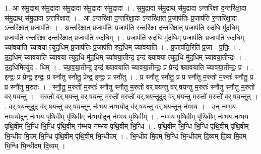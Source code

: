 \documentclass[17pt]{extarticle}
\begin{document}
1. आ स॑मु॒द्राथ् स॑मु॒द्रादा स॑मु॒द्रादा स॑मु॒द्रादा स॑मु॒द्रादा । . स॒मु॒द्रादा स॑मु॒द्राथ् स॑मु॒द्रादा ऽन्तरि॑क्षा द॒न्तरि॑क्षा॒दा स॑मु॒द्राथ् स॑मु॒द्रादा ऽन्तरि॑क्षात् । . आ ऽन्तरि॑क्षा द॒न्तरि॑क्षा॒दा ऽन्तरि॑क्षात् प्र॒जाप॑तिः प्र॒जाप॑ति र॒न्तरि॑क्षा॒दा ऽन्तरि॑क्षात् प्र॒जाप॑तिः । . अ॒न्तरि॑क्षात् प्र॒जाप॑तिः प्र॒जाप॑ति र॒न्तरि॑क्षा द॒न्तरि॑क्षात् प्र॒जाप॑ति रुद॒धि मु॑द॒धिम् प्र॒जाप॑ति र॒न्तरि॑क्षा द॒न्तरि॑क्षात् प्र॒जाप॑ति रुद॒धिम् । . प्र॒जाप॑ति रुद॒धि मु॑द॒धिम् प्र॒जाप॑तिः प्र॒जाप॑ति रुद॒धिम् च्या॑वयाति च्यावया त्युद॒धिम् प्र॒जाप॑तिः प्र॒जाप॑ति रुद॒धिम् च्या॑वयाति । . प्र॒जाप॑ति॒रिति॑ प्र॒जा - प॒तिः॒ । . उ॒द॒धिम् च्या॑वयाति च्यावया त्युद॒धि मु॑द॒धिम् च्या॑वया॒तीन्द्र॒ इन्द्र॑ श्च्यावया त्युद॒धि मु॑द॒धिम् च्या॑वया॒तीन्द्रः॑ । . उ॒द॒धिमित्यु॑द - धिम् । . च्या॒व॒या॒तीन्द्र॒ इन्द्र॑ श्च्यावयाति च्यावया॒तीन्द्रः॒ प्र प्रेन्द्र॑ श्च्यावयाति च्यावया॒तीन्द्रः॒ प्र । . इन्द्रः॒ प्र प्रेन्द्र॒ इन्द्रः॒ प्र स्नौ॑तु स्नौतु॒ प्रेन्द्र॒ इन्द्रः॒ प्र स्नौ॑तु । . प्र स्नौ॑तु स्नौतु॒ प्र प्र स्नौ॑तु म॒रुतो॑ म॒रुतः॑ स्नौतु॒ प्र प्र स्नौ॑तु म॒रुतः॑ । . स्नौ॒तु॒ म॒रुतो॑ म॒रुतः॑ स्नौतु स्नौतु म॒रुतो॑ वर्.षयन्तु वर्.षयन्तु म॒रुतः॑ स्नौतु स्नौतु म॒रुतो॑ वर्.षयन्तु । . म॒रुतो॑ वर्.षयन्तु वर्.षयन्तु म॒रुतो॑ म॒रुतो॑ वर्.षय॒न्तूदुद् व॑र्.षयन्तु म॒रुतो॑ म॒रुतो॑ वर्.षय॒न्तूत् । . व॒र्॒.ष॒य॒न्तूदुद् व॑र्.षयन्तु वर्.षय॒न्तून् न॑म्भय नम्भ॒योद् व॑र्.षयन्तु वर्.षय॒न्तून् न॑म्भय । . उन् न॑म्भय नम्भ॒योदुन् न॑म्भय पृथि॒वीम् पृ॑थि॒वीम् न॑म्भ॒योदुन् न॑म्भय पृथि॒वीम् । . न॒म्भ॒य॒ पृ॒थि॒वीम् पृ॑थि॒वीम् न॑म्भय नम्भय पृथि॒वीम् भि॒न्धि भि॒न्धि पृ॑थि॒वीम् न॑म्भय नम्भय पृथि॒वीम् भि॒न्धि । . पृ॒थि॒वीम् भि॒न्धि भि॒न्धि पृ॑थि॒वीम् पृ॑थि॒वीम् भि॒न्धीद मि॒दम् भि॒न्धि पृ॑थि॒वीम् पृ॑थि॒वीम् भि॒न्धीदम् । . भि॒न्धीद मि॒दम् भि॒न्धि भि॒न्धीदम् दि॒व्यम् दि॒व्य मि॒दम् भि॒न्धि भि॒न्धीदम् दि॒व्यम् । \newline
\end{document}
